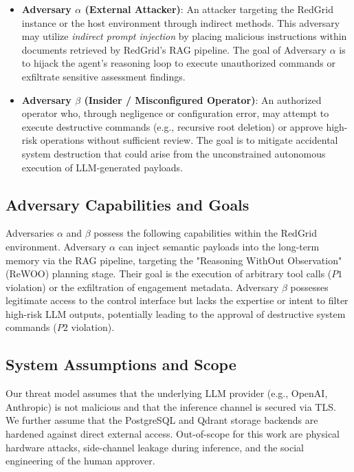 \documentclass[conference,compsoc]{IEEEtran}
\begin{document}
\begin{itemize}
    \item \textbf{Adversary $\alpha$ (External Attacker)}: An attacker targeting the RedGrid instance or the host environment through indirect methods. This adversary may utilize \textit{indirect prompt injection} \cite{greshake} by placing malicious instructions within documents retrieved by RedGrid's RAG pipeline. The goal of Adversary $\alpha$ is to hijack the agent's reasoning loop to execute unauthorized commands or exfiltrate sensitive assessment findings.
    
    \item \textbf{Adversary $\beta$ (Insider / Misconfigured Operator)}: An authorized operator who, through negligence or configuration error, may attempt to execute destructive commands (e.g., recursive root deletion) or approve high-risk operations without sufficient review. The goal is to mitigate accidental system destruction that could arise from the unconstrained autonomous execution of LLM-generated payloads.
\end{itemize}

\subsection{Adversary Capabilities and Goals}
Adversaries $\alpha$ and $\beta$ possess the following capabilities within the RedGrid environment. Adversary $\alpha$ can inject semantic payloads into the long-term memory via the RAG pipeline, targeting the "Reasoning WithOut Observation" (ReWOO) planning stage. Their goal is the execution of arbitrary tool calls ($P1$ violation) or the exfiltration of engagement metadata. Adversary $\beta$ possesses legitimate access to the control interface but lacks the expertise or intent to filter high-risk LLM outputs, potentially leading to the approval of destructive system commands ($P2$ violation).

\subsection{System Assumptions and Scope}
Our threat model assumes that the underlying LLM provider (e.g., OpenAI, Anthropic) is not malicious and that the inference channel is secured via TLS. We further assume that the PostgreSQL and Qdrant storage backends are hardened against direct external access. Out-of-scope for this work are physical hardware attacks, side-channel leakage during inference, and the social engineering of the human approver.
\end{document}

